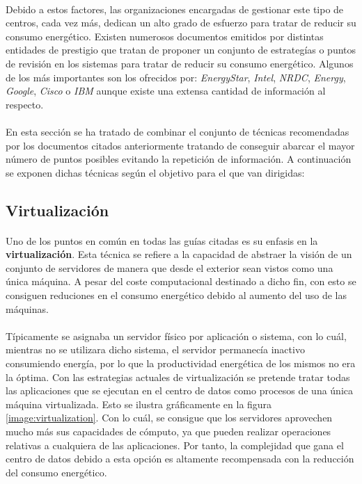 \documentclass[10pt]{article}
\begin{document}
		\paragraph{}
		Debido a estos factores, las organizaciones encargadas de gestionar este tipo de centros, cada vez más, dedican un alto grado de esfuerzo para tratar de reducir su consumo energético. Existen numerosos documentos emitidos por distintas entidades de prestigio que tratan de proponer un conjunto de estrategías o puntos de revisión en los sistemas para tratar de reducir su consumo energético. Algunos de los más importantes son los ofrecidos por: \emph{EnergyStar}\cite{energy-star:guide}, \emph{Intel}\cite{intel:guide}, \emph{NRDC}\cite{nrdc:guide}, \emph{Energy}\cite{energy:guide}, \emph{Google}\cite{google:case_study}, \emph{Cisco}\cite{cisco:guide} o  \emph{IBM}\cite{ibm:guide} aunque existe una extensa cantidad de información al respecto.

		\paragraph{}
		En esta sección se ha tratado de combinar el conjunto de técnicas recomendadas por los documentos citados anteriormente tratando de conseguir abarcar el mayor número de puntos posibles evitando la repetición de información. A continuación se exponen dichas técnicas según el objetivo para el que van dirigidas:


		\subsection{Virtualización}

			\paragraph{}
			Uno de los puntos en común en todas las guías citadas es su enfasis en la \textbf{virtualización}. Esta técnica se refiere a la capacidad de abstraer la visión de un conjunto de servidores de manera que desde el exterior sean vistos como una única máquina. A pesar del coste computacional destinado a dicho fin, con esto se consiguen reduciones en el consumo energético debido al aumento del uso de las máquinas.

			\paragraph{}
			Típicamente se asignaba un servidor físico por aplicación o sistema, con lo cuál, mientras no se utilizara dicho sistema, el servidor permanecía inactivo consumiendo energía, por lo que la productividad energética de los mismos no era la óptima. Con las estrategias actuales de virtualización se pretende tratar todas las aplicaciones que se ejecutan en el centro de datos como procesos de una única máquina virtualizada. Esto se ilustra gráficamente en la figura \ref{image:virtualization}. Con lo cuál, se consigue que los servidores aprovechen mucho más sus capacidades de cómputo, ya que pueden realizar operaciones relativas a cualquiera de las aplicaciones. Por tanto, la complejidad que gana el centro de datos debido a esta opción es altamente recompensada con la reducción del consumo energético.
\end{document}
